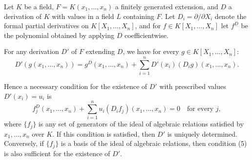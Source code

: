 Let $K$ be a field, $F = K(x_1, \ldots, x_n)$ a finitely generated extension, and $D$ a derivation of $K$ with values in a field $L$ containing $F$. Let $D_i = \partial/\partial X_i$ denote the formal partial derivatives on $K[X_1, \ldots, X_n]$, and for $f \in K[X_1, \ldots, X_n]$ let $f^D$ be the polynomial obtained by applying $D$ coefficientwise.

For any derivation $D'$ of $F$ extending $D$, we have for every $g \in K[X_1, \ldots, X_n]$:
$$D'(g(x_1, \ldots, x_n)) = g^D(x_1, \ldots, x_n) + \sum_{i=1}^n D'(x_i) (D_i g)(x_1, \ldots, x_n). \tag{7}$$

Hence a necessary condition for the existence of $D'$ with prescribed values $D'(x_i) = u_i$ is
$$f_j^D(x_1, \ldots, x_n) + \sum_{i=1}^n u_i (D_i f_j)(x_1, \ldots, x_n) = 0 \quad \text{for every } j, \tag{5}$$
where $\{f_j\}$ is any set of generators of the ideal of algebraic relations satisfied by $x_1, \ldots, x_n$ over $K$. If this condition is satisfied, then $D'$ is uniquely determined. Conversely, if $\{f_j\}$ is a basis of the ideal of algebraic relations, then condition (5) is also sufficient for the existence of $D'$.
